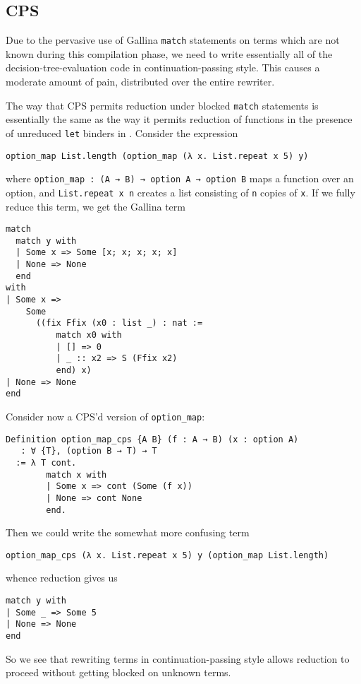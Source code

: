 \subsection{CPS}\label{sec:rewriting-more:pre-reduction:cps}
Due to the pervasive use of Gallina \texttt{match} statements on terms which are not known during this compilation phase, we need to write essentially all of the decision-tree-evaluation code in continuation-passing style.
This causes a moderate amount of pain, distributed over the entire rewriter.

The way that CPS permits reduction under blocked \texttt{match} statements is essentially the same as the way it permits reduction of functions in the presence of unreduced \texttt{let} binders in .
Consider the expression
\begin{center}
\begin{verbatim}
option_map List.length (option_map (λ x. List.repeat x 5) y)
\end{verbatim}
\end{center}
\noindent
where \texttt{option_map : (A → B) → option A → option B} maps a function over an option, and \texttt{List.repeat x n} creates a list consisting of \texttt{n} copies of \texttt{x}.
If we fully reduce this term, we get the Gallina term
\begin{verbatim}
match
  match y with
  | Some x => Some [x; x; x; x; x]
  | None => None
  end
with
| Some x =>
    Some
      ((fix Ffix (x0 : list _) : nat :=
          match x0 with
          | [] => 0
          | _ :: x2 => S (Ffix x2)
          end) x)
| None => None
end
\end{verbatim}

Consider now a CPS'd version of \texttt{option_map}:
\begin{verbatim}
Definition option_map_cps {A B} (f : A → B) (x : option A)
   : ∀ {T}, (option B → T) → T
  := λ T cont.
        match x with
        | Some x => cont (Some (f x))
        | None => cont None
        end.
\end{verbatim}
\noindent
Then we could write the somewhat more confusing term
\begin{verbatim}
option_map_cps (λ x. List.repeat x 5) y (option_map List.length)
\end{verbatim}
\noindent
whence reduction gives us
\begin{verbatim}
match y with
| Some _ => Some 5
| None => None
end
\end{verbatim}
\noindent
So we see that rewriting terms in continuation-passing style allows reduction to proceed without getting blocked on unknown terms.

